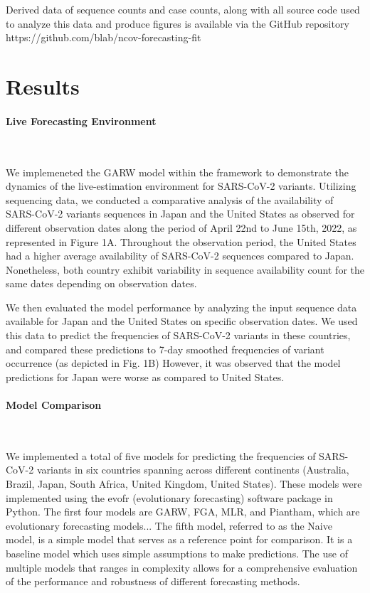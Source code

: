 \documentclass[11pt,oneside,letterpaper]{article}
\begin{document}
Derived data of sequence counts and case counts, along with all source code used to analyze
this data and produce figures is available via the GitHub repository https://github.com/blab/ncov-forecasting-fit





\section*{Results} 


\paragraph{Live Forecasting Environment}\

We implemeneted the GARW model within the framework to demonstrate the dynamics of the live-estimation environment for SARS-CoV-2 variants.
Utilizing sequencing data, we conducted a comparative analysis of the availability of SARS-CoV-2 variants sequences in Japan and the United States as observed for different observation dates along the period of April 22nd to June 15th, 2022, as represented in Figure 1A.
Throughout the observation period, the United States had a higher average availability of SARS-CoV-2 sequences compared to Japan. 
Nonetheless, both country exhibit variability in sequence availability count for the same dates depending on observation dates. 


We then evaluated the model performance by analyzing the input sequence data available for Japan and the United States on specific observation dates.
We used this data to predict the frequencies of SARS-CoV-2 variants in these countries, and compared these predictions to 7-day smoothed frequencies of variant occurrence (as depicted in Fig. 1B)
However, it was observed that the model predictions for Japan were worse as compared to United States.



\paragraph{Model Comparison}\


We implemented a total of five models for predicting the frequencies of SARS-CoV-2 variants in six countries spanning across different continents (Australia, Brazil, Japan, South Africa, United Kingdom, United States).
These models were implemented using the evofr (evolutionary forecasting) software package in Python.
The first four models are GARW, FGA, MLR, and Piantham, which are evolutionary forecasting models... %
The fifth model, referred to as the Naive model, is a simple model that serves as a reference point for comparison.
It is a baseline model which uses simple assumptions to make predictions. 
The use of multiple models that ranges in complexity allows for a comprehensive evaluation of the performance and robustness of different forecasting methods.
\end{document}
